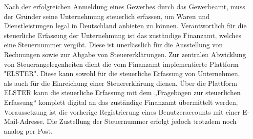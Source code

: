 Nach der erfolgreichen Anmeldung eines Gewerbes durch das Gewerbeamt, muss der Gründer seine Unternehmung steuerlich erfassen, um Waren und Dienstleistungen legal in Deutschland anbieten zu können. Verantwortlich für die steuerliche Erfassung der Unternehmung ist das zuständige Finanzamt, welches eine Steuernummer vergibt. Diese ist unerlässlich für die Ausstellung von Rechnungen sowie zur Abgabe von Steuererklärungen.
Zur zentralen Abwicklung von Steuerangelegenheiten dient die vom Finanzamt implementierte Plattform "ELSTER". Diese kann sowohl für die steuerliche Erfassung von Unternehmen, als auch für die Einreichung einer Steuererklärung dienen. Über die Plattform ELSTER kann die steuerliche Erfassung mit dem „Fragebogen zur steuerlichen Erfassung“ komplett digital an das zuständige Finanzamt übermittelt werden, Voraussetzung ist die vorherige Registrierung eines Benutzeraccounts mit einer E-Mail-Adresse. Die Zustellung der Steuernummer erfolgt jedoch trotzdem noch analog per Post.
